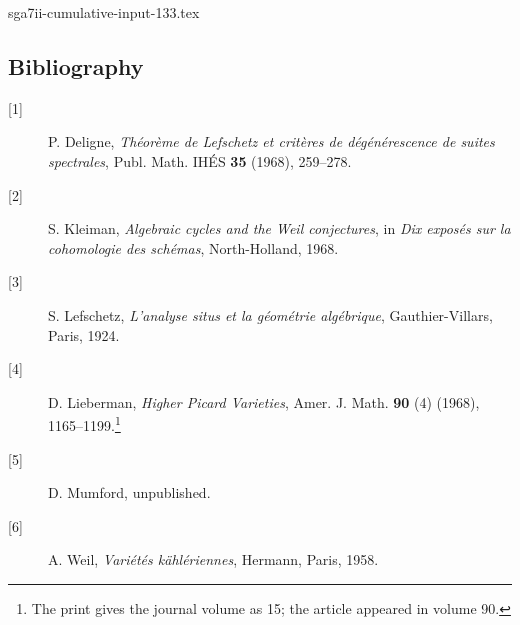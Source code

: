 \begin{filecontents*}{sga7ii-cumulative-input-133.tex}
\subsection*{Bibliography}

\begin{description}
\item[{[1]}] P. Deligne, \emph{Théorème de Lefschetz et critères de
dégénérescence de suites spectrales}, Publ. Math. IHÉS \textbf{35}
(1968), 259--278.

\item[{[2]}] S. Kleiman, \emph{Algebraic cycles and the Weil
conjectures}, in \emph{Dix exposés sur la cohomologie des schémas},
North-Holland, 1968.

\item[{[3]}] S. Lefschetz, \emph{L'analyse situs et la géométrie
algébrique}, Gauthier-Villars, Paris, 1924.

\item[{[4]}] D. Lieberman, \emph{Higher Picard Varieties}, Amer. J.
Math. \textbf{90} (4) (1968), 1165--1199.\footnote{The print gives the
journal volume as 15; the article appeared in volume 90.}

\item[{[5]}] D. Mumford, unpublished.

\item[{[6]}] A. Weil, \emph{Variétés kählériennes}, Hermann, Paris,
1958.
\end{description}

\end{filecontents*}
